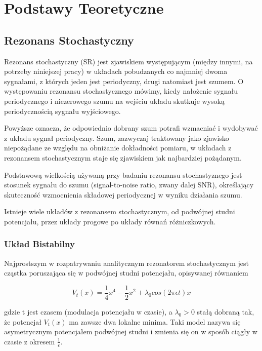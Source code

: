   \section{Podstawy Teoretyczne}
  
  \subsection{Rezonans Stochastyczny}
  
  Rezonans stochastyczny (SR) jest zjawiskiem występującym (między innymi, na potrzeby niniejszej pracy) w układach pobudzanych co najmniej dwoma sygnałami, z których jeden jest periodyczny, drugi natomiast jest szumem. O występowaniu rezonansu stochastycznego mówimy, kiedy nałożenie sygnału periodycznego i niezerowego szumu na wejściu układu skutkuje wysoką periodycznością sygnału wyjściowego.
  
  Powyższe oznacza, że odpowiednio dobrany szum potrafi wzmacniać i wydobywać z układu sygnał periodyczny. Szum, zazwyczaj traktowany jako zjawisko niepożądane ze względu na obniżanie dokładności pomiaru, w układach z rezonansem stochastycznym staje się zjawiskiem jak najbardziej pożądanym. 
  
  Podstawową wielkością używaną przy badaniu rezonansu stochastyznego jest stosunek sygnału do szumu (signal-to-noise ratio, zwany dalej SNR), określający skuteczność wzmocnienia składowej periodycznej w wyniku działania szumu.

  Istnieje wiele układów z rezonansem stochastycznym, od podwójnej studni potencjału, przez układy progowe po układy równań różniczkowych.

  \subsubsection{Układ Bistabilny}
  \label{sec:uklad_bistabilny}

  Najprostszym w rozpatrywaniu analitycznym rezonatorem stochastycznym jest cząstka poruszająca się w  podwójnej studni potencjału, opisywanej równaniem

  \begin{equation} \label{sr:1}
    V_t(x) = \frac{1}{4} x^4 - \frac{1}{2} x^2 + \lambda_0 cos(2 \pi \epsilon t) x
  \end{equation}

  gdzie t jest czasem (modulacja potencjału w czasie), a $\lambda_0 > 0$ stałą dobraną tak, że potencjał $V_t(x)$ ma zawsze dwa lokalne minima. Taki model nazywa się asymetrycznym potencjałem podwójnej studni i zmienia się on w sposób ciągły w czasie z okresem $\frac{1}{\epsilon}$.

